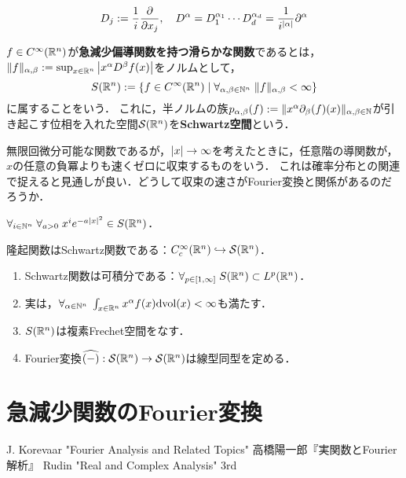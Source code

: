 \documentclass[uplatex,dvipdfmx]{jsreport}
\begin{document}
\begin{notation}
    \[D_j:=\frac{1}{i}\frac{\partial }{\partial x_j},\quad D^\alpha=D^{\alpha_1}_1\cdots D^{\alpha_d}_d=\frac{1}{i^{\lvert\alpha\rvert}}\partial^\alpha\]
\end{notation}

\begin{definition}
    $f\in C^\infty(\mathbb{R}^n)$が\textbf{急減少偏導関数を持つ滑らかな関数}であるとは，$\|f\|_{\alpha,\beta}:=\sup_{x\in\mathbb{R}^n}\left|x^\alpha D^\beta f(x)\right|$をノルムとして，
    \[S(\mathbb{R}^n):=\left\{f\in C^\infty(\mathbb{R}^n)\mid\forall_{\alpha,\beta\in\mathbb{N}^n}\;\|f\|_{\alpha,\beta}<\infty\right\}\]
    に属することをいう．
    これに，半ノルムの族$p_{\alpha,\beta}(f):=\|x^\alpha\partial_\beta(f)(x)\|_{\alpha,\beta\in\mathbb{N}}$が引き起こす位相を入れた空間$\mathcal{S}(\mathbb{R}^n)$を\textbf{Schwartz空間}という．
\end{definition}
\begin{remarks}
    無限回微分可能な関数であるが，$\lvert x\rvert\to\infty$を考えたときに，任意階の導関数が，$x$の任意の負冪よりも速くゼロに収束するものをいう．
    これは確率分布との関連で捉えると見通しが良い．どうして収束の速さがFourier変換と関係があるのだろうか．
\end{remarks}

\begin{example}[Gauss関数]
    $\forall_{i\in\mathbb{N}^n}\;\forall_{a>0}\;x^ie^{-a\lvert x\rvert^2}\in S(\mathbb{R}^n)$．
\end{example}

\begin{example}
    隆起関数はSchwartz関数である：$C^\infty_c(\mathbb{R}^n)\hookrightarrow\mathcal{S}(\mathbb{R}^n)$．
\end{example}

\begin{theorem}\mbox{}
    \begin{enumerate}
        \item Schwartz関数は可積分である：$\forall_{p\in[1,\infty]}\;S(\mathbb{R}^n)\subset L^p(\mathbb{R}^n)$．
        \item 実は，$\forall_{\alpha\in\mathbb{N}^n}\;\int_{x\in\mathbb{R}^n}x^\alpha f(x)\mathrm{dvol}(x)<\infty$も満たす．
        \item $S(\mathbb{R}^n)$は複素Frechet空間をなす．
        \item Fourier変換$\widehat{(-)}:\mathcal{S}(\mathbb{R}^n)\to\mathcal{S}(\mathbb{R}^n)$は線型同型を定める．
    \end{enumerate}
\end{theorem}

\section{急減少関数のFourier変換}

\begin{thebibliography}{9}
    J. Korevaar "Fourier Analysis and Related Topics"
    高橋陽一郎『実関数とFourier解析』
    Rudin "Real and Complex Analysis" 3rd
\end{thebibliography}
\end{document}

